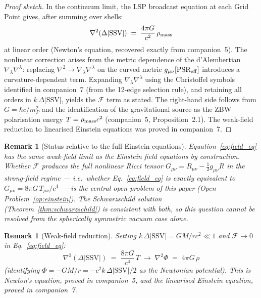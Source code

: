 \documentclass[12pt]{article}
\newtheorem{remark}[theorem]{Remark}
\newcommand{\mP}{m_P}
\newcommand{\SSV}{\text{SSV}}
\newcommand{\PSR}{\text{PSR}}
\begin{document}
\begin{proof}[Proof sketch]
In the continuum limit, the LSP broadcast equation at each Grid Point
gives, after summing over shells:
\begin{equation}
  \nabla^2(\Delta|\SSV|) \;=\; \frac{4\pi G}{c^2}\,\rho_{\rm mass}
  \label{eq:poisson}
\end{equation}
at linear order (Newton's equation, recovered exactly from companion~5).
The nonlinear correction arises from the metric dependence of the
d'Alembertian $\nabla_\lambda\nabla^\lambda$: replacing
$\nabla^2 \to \nabla_\lambda\nabla^\lambda$ on the curved metric
$g_{\mu\nu}[\PSR_{\rm eff}]$ introduces a curvature-dependent term.
Expanding $\nabla_\lambda\nabla^\lambda$ using the Christoffel symbols
identified in companion~7 (from the 12-edge selection rule), and
retaining all orders in $k\,\Delta|\SSV|$, yields the
$\mathcal{F}$ term as stated.  The right-hand side follows from
$G = \hbar c/\mP^2$ and the identification of the gravitational
source as the ZBW polarisation energy $T = \rho_{\rm mass}c^2$
(companion~5, Proposition~2.1).  The weak-field reduction to
linearised Einstein equations was proved in companion~7.
\end{proof}

\begin{remark}[Status relative to the full Einstein equations]
Equation~\eqref{eq:field_eq} has the same weak-field limit as the
Einstein field equations by construction.  Whether $\mathcal{F}$
produces the full nonlinear Ricci tensor
$G_{\mu\nu} = R_{\mu\nu} - \tfrac{1}{2}g_{\mu\nu}R$ in the
strong-field regime --- i.e.\ whether Eq.~\eqref{eq:field_eq}
is exactly equivalent to $G_{\mu\nu} = 8\pi G\,T_{\mu\nu}/c^4$ ---
is the central open problem of this paper (Open Problem~\ref{op:einstein}).
The Schwarzschild solution (Theorem~\ref{thm:schwarzschild}) is
consistent with both, so this question cannot be resolved from the
spherically symmetric vacuum case alone.
\end{remark}

\begin{remark}[Weak-field reduction]
Setting $k\,\Delta|\SSV| = GM/rc^2 \ll 1$ and $\mathcal{F} \to 0$
in Eq.~\eqref{eq:field_eq}:
\begin{equation}
  \nabla^2(\Delta|\SSV|) \;=\; \frac{8\pi G}{c^4}\,T
  \;\longrightarrow\;
  \nabla^2\Phi \;=\; 4\pi G\,\rho
  \label{eq:weak_reduction}
\end{equation}
(identifying $\Phi = -GM/r = -c^2 k\,\Delta|\SSV|/2$ as the
Newtonian potential).  This is Newton's equation, proved in
companion~5, and the linearised Einstein equation, proved in
companion~7.
\end{remark}
\end{document}
